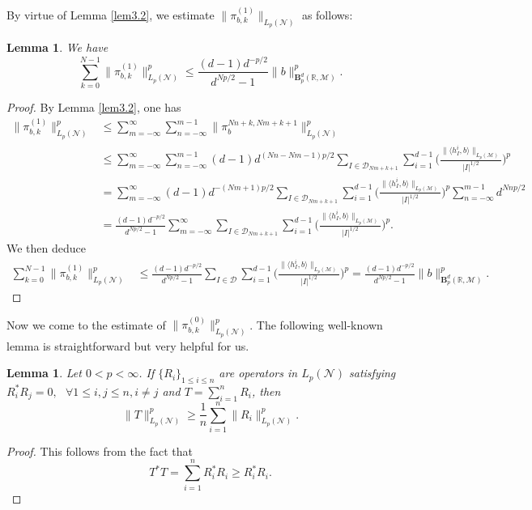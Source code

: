 \documentclass[oneside,english,a4wide]{amsart}
\numberwithin{equation}{section}
\numberwithin{figure}{section}
\theoremstyle{plain}
\theoremstyle{plain}
\theoremstyle{definition}
\theoremstyle{plain}
\newtheorem{lemma}[thm]{Lemma}
\theoremstyle{remark}
\theoremstyle{definition}
\theoremstyle{remark}
\theoremstyle{definition}
\newcommand{\M}{{\mathcal M}}
\newcommand{\8}{\infty}
\begin{document}
By virtue of Lemma \ref{lem3.2}, we estimate $\|\pi_{b,k}^{(1)}\|_{L_p(\mathcal{N})}$ as follows:
\begin{lemma}\label{cor3.12}
		We have $$\sum\limits_{k=0}^{N-1}\|\pi^{(1)}_{b,k}\|^p_{{L_p(\mathcal{N})}}\leq \frac{(d-1)d^{-p/2}}{d^{Np/2}-1}\|b\|^p_{\pmb{B}^d_p(\mathbb{R},\M)}.$$
	\end{lemma}
\begin{proof}
	By Lemma \ref{lem3.2}, one has
	\[\begin{aligned}
		\|\pi_{b,k}^{(1)}\|^p_{L_p(\mathcal{N})}{}&\le \sum_{m=-\infty}^{\infty}\sum_{n=-\infty}^{m-1} \|\pi_b^{Nn+k,Nm+k+1}\|^p_{L_p(\mathcal{N})}\\&\le\sum_{m=-\infty}^{\infty}\sum_{n=-\infty}^{m-1}(d-1)d^{{(Nn-Nm-1)p}/{2}}\sum_{I\in \mathcal{D}_{Nm+k+1}}\sum_{i=1}^{d-1}\biggl(\frac{\|\langle h_I^i,b\rangle\|_{L_p(\mathcal{M})}}{|I|^{1/2}}\biggr)^p\\&=\sum_{m=-\infty}^{\infty}(d-1)d^{-(Nm+1)p/2}\sum_{I\in \mathcal{D}_{Nm+k+1}}\sum_{i=1}^{d-1}\biggl(\frac{\|\langle h_I^i,b\rangle\|_{L_p(\mathcal{M})}}{|I|^{1/2}}\biggr)^p\sum_{n=-\infty}^{m-1}d^{Nnp/2}\\&=\frac{(d-1)d^{-p/2}}{d^{Np/2}-1}\sum_{m=-\infty}^{\infty}\sum_{I\in \mathcal{D}_{Nm+k+1}}\sum_{i=1}^{d-1}\biggl(\frac{\|\langle h_I^i,b\rangle\|_{L_p(\mathcal{M})}}{|I|^{1/2}}\biggr)^p.
	\end{aligned}\]
	We then deduce
	\begin{equation*}
		\begin{aligned}
			\sum_{k=0}^{N-1}\|\pi^{(1)}_{b,k}\|^p_{{L_p(\mathcal{N})}}&\le \frac{(d-1)d^{-p/2}}{d^{Np/2}-1}\sum_{I\in \mathcal{D}}\sum_{i=1}^{d-1}\biggl(\frac{\|\langle h_I^i,b\rangle\|_{L_p(\mathcal{M})}}{|I|^{1/2}}\biggr)^p
			= \frac{(d-1)d^{-p/2}}{d^{Np/2}-1}\|b\|^p_{\pmb{B}^d_p(\mathbb{R},\M)}.
		\end{aligned}
	\end{equation*}
\end{proof}

Now we come to the estimate of $\|\pi^{(0)}_{b,k}\|^p_{{L_p(\mathcal{N})}}$. The following well-known lemma is straightforward but very helpful for us.
\begin{lemma}\label{lem3.3}
	Let $0<p<\infty$. If $\{R_i\}_{1\le i\le n}$  are operators in $L_p(\mathcal{N})$ satisfying $R_i^*R_j=0,\,\,\,\,\forall 1\le i,j\le n, i\neq j$ and $T=\sum\limits_{i=1}^nR_i$, then
	\begin{equation}\label{ine3.13}
		\|T\|^p_{{L_p(\mathcal{N})}}\ge \frac{1}{n}\sum_{i=1}^n\|R_i\|^p_{{L_p(\mathcal{N})}}.
	\end{equation}
\end{lemma}
\begin{proof}
	This follows from the fact that
	$$ T^*T=\sum_{i=1}^{n}R_i^*R_i\geq R_i^*R_i.  $$
\end{proof}
\end{document}
